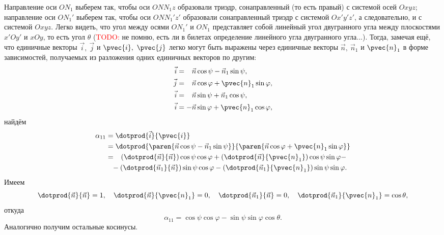 Направление оси $ON_1$ выберем так, чтобы оси $ONN_1 z$ образовали триэдр,
сонаправленный (то есть правый) с системой осей $Oxyz$; направление оси $ON_1'$
выберем так, чтобы оси $ONN_1' z'$ образовали сонаправленный триэдр с системой
$Ox'y'z'$, а следовательно, и с системой $Oxyz$. Легко видеть, что угол между
осями $ON_1'$ и $ON_1$ представляет собой линейный угол двугранного угла между
плоскостями $x'Oy'$ и $xOy$, то есть угол $\theta$ (\textcolor{red}{TODO:} не
помню, есть ли в билетах определение линейного угла двугранного угла...).
Тогда, замечая ещё, что единичные векторы $\vec{i},~\vec{j}$ и $\pvec{i},~
\pvec{j}$ легко могут быть выражены через единичные векторы $\vec{n},~\vec{n}_1$
и $\pvec{n}_1$ в форме зависимостей, получаемых из разложения одних единичных
векторов по другим:
\begin{equation}
  \begin{aligned}
    \vec{i} &= \phantom{-} \vec{n} \cos\psi - \vec{n}_1 \sin\psi, \\
    \vec{j} &= \phantom{-} \vec{n} \cos\varphi + \pvec{n}_1 \sin\varphi, \\
    \vec{i} &= \phantom{-} \vec{n} \sin\psi + \vec{n}_1 \cos\psi, \\
    \vec{i} &= -\vec{n} \sin\varphi + \pvec{n}_1 \cos\varphi, \\
  \end{aligned}
\end{equation}
найдём
\begin{equation*}
  \begin{aligned}
    \alpha_{11} &= \dotprod{\vec{i}}{\pvec{i}} \\
      &= \dotprod{
        \paren{\vec{n} \cos\psi - \vec{n}_1 \sin\psi}
      }{
        \paren{\vec{n} \cos\varphi + \pvec{n}_1 \sin\varphi}
      } \\
      &= \phantom{-}
        (\dotprod{\vec{n}}{\vec{n}}) \cos\psi \cos\varphi +
        (\dotprod{\vec{n}}{\pvec{n}_1}) \cos\psi \sin\varphi - \\
      &\phantom{=} -
        (\dotprod{\vec{n}_1}{\vec{n}}) \sin\psi \cos\varphi -
        (\dotprod{\vec{n}_1}{\pvec{n}_1}) \sin\psi \sin\varphi.
  \end{aligned}
\end{equation*}
Имеем
\begin{equation*}
  \dotprod{\vec{n}}{\vec{n}} = 1, \quad
  \dotprod{\vec{n}}{\pvec{n}_1} = 0, \quad
  \dotprod{\vec{n}_1}{\vec{n}} = 0, \quad
  \dotprod{\vec{n}_1}{\pvec{n}_1} = \cos\theta,
\end{equation*}
откуда
\begin{equation*}
  \alpha_{11} = \cos\psi \cos\varphi - \sin\psi \sin\varphi \cos\theta.
\end{equation*}
Аналогично получим остальные косинусы.

